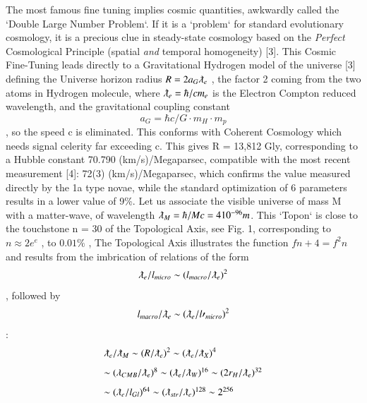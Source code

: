 \documentclass[twoside,draft]{article}
\begin{document}
\begin{sloppypar}
{The most famous fine tuning implies cosmic quantities, awkwardly called the `Double
Large Number Problem`. If it is a `problem` for standard evolutionary cosmology, it is a precious
clue in steady-state cosmology based on the \textit{Perfect} Cosmological Principle (spatial \textit{and} temporal
homogeneity) [3].
This Cosmic Fine-Tuning leads directly to a Gravitational Hydrogen model of the universe [3]
defining the Universe horizon radius $R = 2a_{G} \lambdabar_{e}$ , the factor 2 coming from the two atoms in
Hydrogen molecule, where 
$\lambdabar_{e} = \hbar/cm_{e}$
is the Electron Compton reduced wavelength, and the
gravitational coupling constant 
\begin{equation}
a_{G} = \hbar c/G \cdot m_{H} \cdot m_{p}
\end{equation}, so the speed c is eliminated. This conforms with
Coherent Cosmology which needs signal celerity far exceeding c. This gives R = 13,812 Gly, corresponding to a Hubble constant 70.790 (km/s)/Megaparsec, compatible with the
most recent measurement [4]: 72(3) (km/s)/Megaparsec, which confirms the value measured
directly by the 1a type novae, while the standard optimization of 6 parameters results in a lower
value of 9\%.
Let us associate the visible universe of mass M with a matter-wave, of wavelength $\lambdabar_{M} = \hbar /Mc = 4
10^{-96} m$. This `Topon` is close to the touchstone n = 30 of the Topological Axis, see Fig. 1,
corresponding to $n \approx 2e^{e}$ , to $0.01\%$ , The Topological Axis illustrates the function $f{n + 4} = f^{2}{n}$
and results from the imbrication of relations of the form 
\begin{equation}
\lambdabar_{e} /l_{micro} \sim (l_{macro} /\lambdabar_{e})^{2}
\end{equation}
, followed by 
\begin{equation}
l_{macro} /\lambdabar_{e} \sim (\lambdabar_{e} /l\prime_{micro} )^{2}
\end{equation}:
$$
\begin{array}{ll}
%
\displaystyle
\lambdabar_{e}/\lambdabar_{M} \sim (R/\lambdabar_{e})^{2} \sim (\lambdabar_{e}/ \lambdabar_{X})^{4}\\[+8pt]  %
\sim (\lambda_{CMB}/ \lambdabar_{e})^{8} \sim (\lambdabar_{e}/\lambdabar_{W})^{16} \sim (2r_{H} /\lambdabar_{e})^{32}\\[+8pt] %
\sim (\lambdabar_{e}/ l_{Gl} )^{64} \sim (\lambdabar_{str} /\lambdabar_{e} )^{128} \sim 2^{256}\\ %
\end{array}
$$}
\end{sloppypar}
\end{document}
